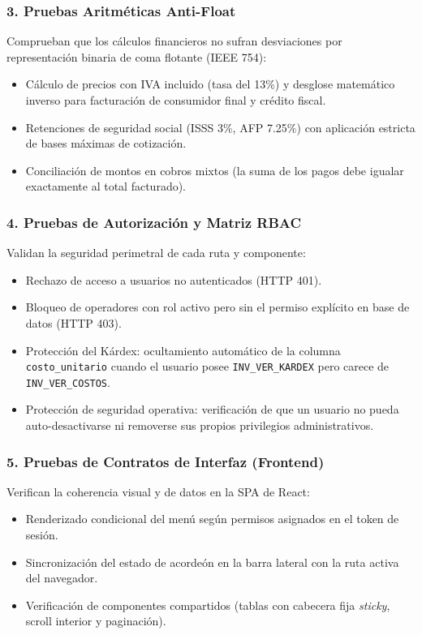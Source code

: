 \subsubsection{3. Pruebas Aritméticas Anti-Float}
Comprueban que los cálculos financieros no sufran desviaciones por representación binaria de coma flotante (IEEE 754):
\begin{itemize}
    \item Cálculo de precios con IVA incluido (tasa del 13\%) y desglose matemático inverso para facturación de consumidor final y crédito fiscal.
    \item Retenciones de seguridad social (ISSS 3\%, AFP 7.25\%) con aplicación estricta de bases máximas de cotización.
    \item Conciliación de montos en cobros mixtos (la suma de los pagos debe igualar exactamente al total facturado).
\end{itemize}

\subsubsection{4. Pruebas de Autorización y Matriz RBAC}
Validan la seguridad perimetral de cada ruta y componente:
\begin{itemize}
    \item Rechazo de acceso a usuarios no autenticados (HTTP 401).
    \item Bloqueo de operadores con rol activo pero sin el permiso explícito en base de datos (HTTP 403).
    \item Protección del Kárdex: ocultamiento automático de la columna \texttt{costo\_unitario} cuando el usuario posee \texttt{INV\_VER\_KARDEX} pero carece de \texttt{INV\_VER\_COSTOS}.
    \item Protección de seguridad operativa: verificación de que un usuario no pueda auto-desactivarse ni removerse sus propios privilegios administrativos.
\end{itemize}

\subsubsection{5. Pruebas de Contratos de Interfaz (Frontend)}
Verifican la coherencia visual y de datos en la SPA de React:
\begin{itemize}
    \item Renderizado condicional del menú según permisos asignados en el token de sesión.
    \item Sincronización del estado de acordeón en la barra lateral con la ruta activa del navegador.
    \item Verificación de componentes compartidos (tablas con cabecera fija \textit{sticky}, scroll interior y paginación).
\end{itemize}

